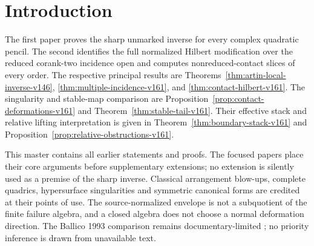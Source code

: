 \begin{abstract}
We prove that an unmarked, ungraded finite local algebra associated
with a complex quadratic pencil determines the pencil up to congruence.
The truncation order $n^2+2n-4$ is sharp, and no regularity assumption
is imposed. Multiplication recovers the first relation, its determinant
rulings, and the orientation that identifies the pencil coefficient
line. The construction extends to families over arbitrary complex
bases. On the effectively rigidified failure stack, the recovered
source carries a scalar-normalized apolar algebra bundle. The associated
multiple-incidence boundary admits explicit multi-Rees equations and
relative lifting conditions. The sharp inverse is proved independently
of this boundary application; its relative, covering, recognition,
and spectral extensions are retained in the appendices. The paired boundary theory identifies the full
multiple-reduced-incidence modification and computes arbitrary-order
Jordan contact slices, thick Hilbert tails, transverse graph
singularities and covered stable-map tails. This master preserves
both mathematical bodies and is not a third submission.
\end{abstract}
\maketitle
\section{Introduction}
\label{sec:introduction-v153}
The first paper proves the sharp unmarked inverse for every complex
quadratic pencil. The second identifies the full normalized Hilbert
modification over the reduced corank-two incidence open and computes
nonreduced-contact slices of every order. The respective principal
results are Theorems~\ref{thm:artin-local-inverse-v146},
\ref{thm:multiple-incidence-v161}, and
\ref{thm:contact-hilbert-v161}. The singularity and stable-map
comparison are Proposition~\ref{prop:contact-deformations-v161}
and Theorem~\ref{thm:stable-tail-v161}. Their effective stack and
relative lifting interpretation is given in
Theorem~\ref{thm:boundary-stack-v161} and
Proposition~\ref{prop:relative-obstructions-v161}.

This master contains all earlier statements and proofs. The focused
papers place their core arguments before supplementary extensions;
no extension is silently used as a premise of the sharp inverse.
Classical arrangement blow-ups, complete quadrics, hypersurface
singularities and symmetric canonical forms are credited at their
points of use. The source-normalized envelope is not a subquotient
of the finite failure algebra, and a closed algebra does not choose
a normal deformation direction. The Ballico 1993 comparison remains
documentary-limited \cite{Ballico93}; no priority inference is drawn
from unavailable text.

